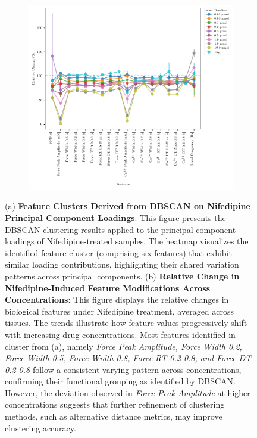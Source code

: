 \documentclass{report}
\begin{document}
\begin{figure}[H]
                \begin{subfigure}[b]{1\textwidth}
                     \centering                 
                    \includegraphics[height=0.54\textheight, keepaspectratio]{plots/chapter_6/relative_differences_nifedipine__average_only.pdf}
                     \caption[Relative Change in Nifedipine-Induced Feature Modifications Across Drug Concentrations.]{}
                     \label{fig:nifedipine-average-concentration-diffs}    
                \end{subfigure}
                \caption[Feature Clusters from PCIA and their Relative Change]{(a) \textbf{Feature Clusters Derived from DBSCAN on Nifedipine Principal Component Loadings}: This figure presents the DBSCAN clustering results applied to the principal component loadings of Nifedipine-treated samples. The heatmap visualizes the identified feature cluster (comprising six features) that exhibit similar loading contributions, highlighting their shared variation patterns across principal components. (b) \textbf{Relative Change in Nifedipine-Induced Feature Modifications Across Concentrations}: This figure displays the relative changes in biological features under Nifedipine treatment, averaged across tissues. The trends illustrate how feature values progressively shift with increasing drug concentrations. Most features identified in cluster from (a), namely \textit{Force Peak Amplitude, Force Width 0.2, Force Width 0.5, Force Width 0.8, Force RT 0.2-0.8, and Force DT 0.2-0.8} follow a consistent varying pattern across concentrations, confirming their functional grouping as identified by DBSCAN. However, the deviation observed in \textit{Force Peak Amplitude} at higher concentrations suggests that further refinement of clustering methods, such as alternative distance metrics, may improve clustering accuracy.}
            \end{figure}
\end{document}
